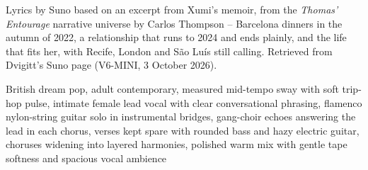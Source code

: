 
\begin{notes}
Lyrics by Suno based on an excerpt from Xumi's memoir, from the \emph{Thomas’ Entourage} narrative universe by Carlos Thompson -- Barcelona dinners in the autumn of 2022, a relationship that runs to 2024 and ends plainly, and the life that fits her, with Recife, London and São Luís still calling. Retrieved from Dvigitt's Suno page (V6-MINI, 3 October 2026).
\end{notes}
\begin{style}
British dream pop, adult contemporary, measured mid-tempo sway with soft trip-hop pulse, intimate female lead vocal with clear conversational phrasing, flamenco nylon-string guitar solo in instrumental bridges, gang-choir echoes answering the lead in each chorus, verses kept spare with rounded bass and hazy electric guitar, choruses widening into layered harmonies, polished warm mix with gentle tape softness and spacious vocal ambience
\end{style}
